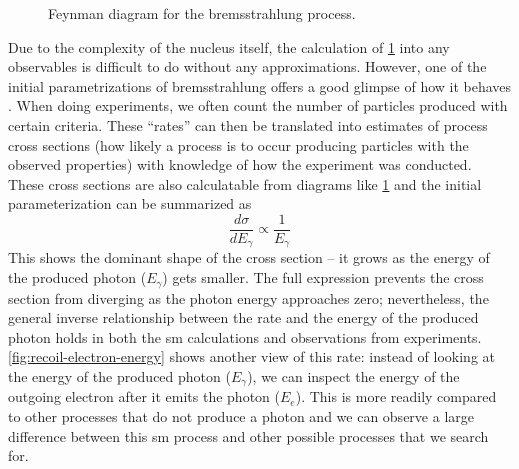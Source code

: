 \begin{figure}
	\centering
	\caption{
		Feynman diagram for the bremsstrahlung process.
	}
	\label{fig:brem-feynman}
\end{figure}

Due to the complexity of the nucleus itself, the calculation of \cref{fig:brem-feynman} into
any observables is difficult to do without any approximations. However, one of the initial parametrizations of
bremsstrahlung offers a good glimpse of how it behaves \cite{bethe-heitler-1934}.
When doing experiments, we often count the number of particles produced with certain criteria.
These ``rates'' can then be translated into estimates of process cross sections (how likely a process
is to occur producing particles with the observed properties) with knowledge of
how the experiment was conducted. These cross sections are also calculatable from diagrams like
\cref{fig:brem-feynman} and the initial parameterization can be summarized as
\[
	\frac{d\sigma}{d E_\gamma} \propto \frac{1}{E_\gamma}
\]
This shows the dominant shape of the cross section
-- it grows as the energy of the produced photon
(\(E_\gamma\)) gets smaller. The full expression prevents the cross section from diverging as the
photon energy approaches zero; nevertheless, the general inverse relationship between the rate and
the energy of the produced photon holds in both the \ac{sm} calculations and observations from
experiments.
\cref{fig:recoil-electron-energy} shows another view of this rate: instead of looking at the
energy of the produced photon ($E_\gamma$), we can inspect the energy of the outgoing electron after
it emits the photon ($E_e$). This is more readily compared to other processes that do not
produce a photon and we can observe a large difference between this \ac{sm} process and other
possible processes that we search for.

